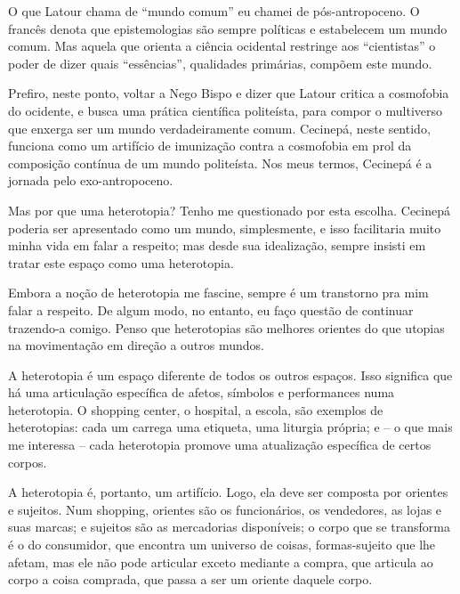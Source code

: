 O que Latour chama de \enquote{mundo comum} eu chamei de pós-antropoceno. O francês denota que epistemologias são sempre políticas e estabelecem um mundo comum. Mas aquela que orienta a ciência ocidental restringe aos \enquote{cientistas} o poder de dizer quais \enquote{essências}, qualidades primárias, compõem este mundo.

Prefiro, neste ponto, voltar a Nego Bispo e dizer que Latour critica a cosmofobia do ocidente, e busca uma prática científica politeísta, para compor o multiverso que enxerga ser um mundo verdadeiramente comum. Cecinepá, neste sentido, funciona como um artifício de imunização contra a cosmofobia em prol da composição contínua de um mundo politeísta. Nos meus termos, Cecinepá é a jornada pelo exo-antropoceno.


Mas por que uma heterotopia? Tenho me questionado por esta escolha. Cecinepá poderia ser apresentado como um mundo, simplesmente, e isso facilitaria muito minha vida em falar a respeito; mas desde sua idealização, sempre insisti em tratar este espaço como uma heterotopia.


Embora a noção de heterotopia me fascine, sempre é um transtorno pra mim falar a respeito. De algum modo, no entanto, eu faço questão de continuar trazendo-a comigo. Penso que heterotopias são melhores orientes do que utopias na movimentação em direção a outros mundos.

A heterotopia é um espaço diferente de todos os outros espaços. Isso significa que há uma articulação específica de afetos, símbolos e performances numa heterotopia. O shopping center, o hospital, a escola, são exemplos de heterotopias: cada um carrega uma etiqueta, uma liturgia própria; e -- o que mais me interessa -- cada heterotopia promove uma atualização específica de certos corpos.

A heterotopia é, portanto, um artifício. Logo, ela deve ser composta por orientes e sujeitos. Num shopping, orientes são os funcionários, os vendedores, as lojas e suas marcas; e sujeitos são as mercadorias disponíveis; o corpo que se transforma é o do consumidor, que encontra um universo de coisas, formas-sujeito que lhe afetam, mas ele não pode articular exceto mediante a compra, que articula ao corpo a coisa comprada, que passa a ser um oriente daquele corpo.

